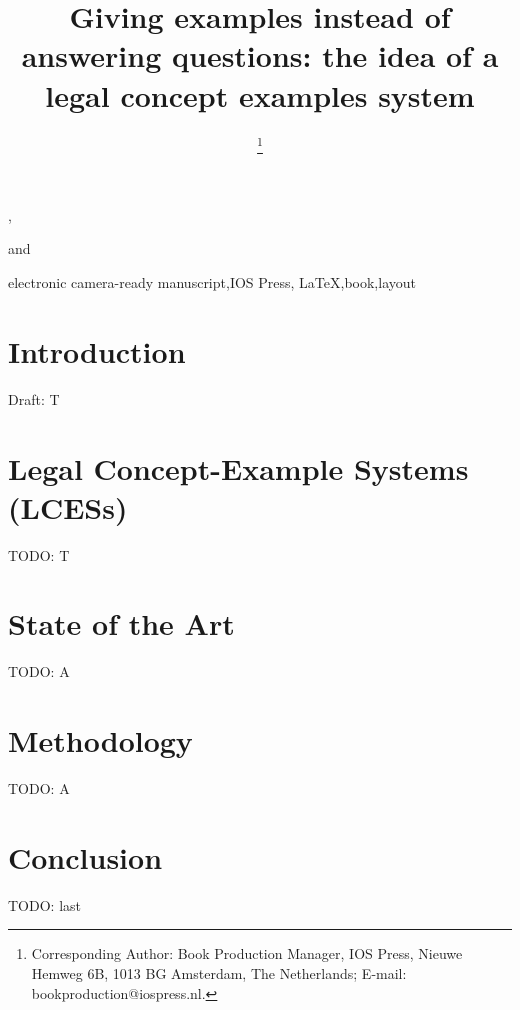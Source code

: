 \documentclass{IOS-Book-Article}
\begin{document}
\begin{frontmatter}              %

\title{Giving examples instead of answering questions: the idea of a legal concept examples system}

\author[A]{ %
\thanks{Corresponding Author: Book Production Manager, IOS Press, Nieuwe Hemweg 6B,
1013 BG Amsterdam, The Netherlands; E-mail:
bookproduction@iospress.nl.}},
\author[B]{ }
and
\author[B]{ }

\address[A]{Book Production Department, IOS Press, The Netherlands}
\address[B]{Short Affiliation of Second Author and Third Author}

\begin{abstract}

\end{abstract}

\begin{keyword}
electronic camera-ready manuscript\sep IOS Press\sep
\LaTeX\sep book\sep layout
\end{keyword}
\end{frontmatter}

\thispagestyle{empty}
\pagestyle{empty}

\section{Introduction}

Draft: T



\section{Legal Concept-Example Systems (LCESs)}

TODO: T


\label{sec:lces}

\section{State of the Art}
\label{sec:sota}

TODO: A



\section{Methodology}
\label{sec:method}

TODO: A




\section{Conclusion}

TODO: last




\begin{thebibliography}{99}



\end{thebibliography}
\end{document}

